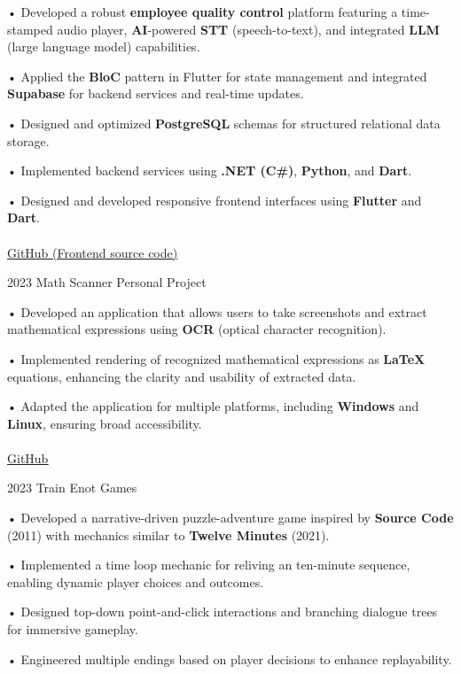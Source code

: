 \documentclass[9pt]{developercv} %
\begin{document}
\begin{entrylist}
{        • Developed a robust \textbf{employee quality control} platform featuring a time-stamped audio player, \textbf{AI}-powered \textbf{STT} (speech-to-text), and integrated \textbf{LLM} (large language model) capabilities.

        • Applied the \textbf{BloC} pattern in Flutter for state management and integrated \textbf{Supabase} for backend services and real-time updates.

        • Designed and optimized \textbf{PostgreSQL} schemas for structured relational data storage.

        • Implemented backend services using \textbf{.NET (C\#)}, \textbf{Python}, and \textbf{Dart}.

        • Designed and developed responsive frontend interfaces using \textbf{Flutter} and \textbf{Dart}.
        \\
        \\
        \href{https://github.com/ekrem-qb/big_b_flutter}{\uline{GitHub (Frontend source code)}}
        \\
    }
    \entry
    {2023}
    {Math Scanner}
    {Personal Project}
    {

    • Developed an application that allows users to take screenshots and extract mathematical expressions using \textbf{OCR} (optical character recognition).

    • Implemented rendering of recognized mathematical expressions as \textbf{LaTeX} equations, enhancing the clarity and usability of extracted data.

    • Adapted the application for multiple platforms, including \textbf{Windows} and \textbf{Linux}, ensuring broad accessibility.
    \\
    \\
    {\href{https://www.github.com/ekrem-qb/math_scan}{\uline{GitHub}}}
    \\
    }
    \entry
    {2023}
    {Train}
    {Enot Games}
    {

        • Developed a narrative-driven puzzle-adventure game inspired by \textbf{Source Code} (2011) with mechanics similar to \textbf{Twelve Minutes} (2021).

        • Implemented a time loop mechanic for reliving an ten-minute sequence, enabling dynamic player choices and outcomes.

        • Designed top-down point-and-click interactions and branching dialogue trees for immersive gameplay.

        • Engineered multiple endings based on player decisions to enhance replayability.

}
\end{entrylist}
\end{document}
